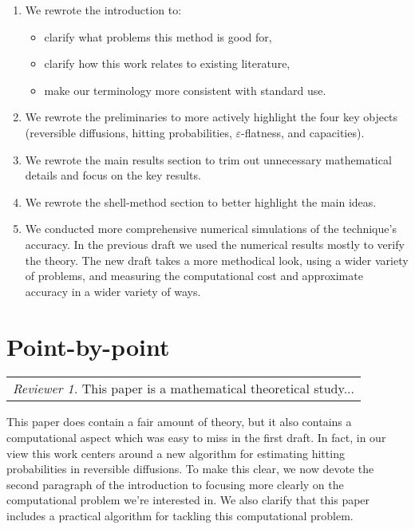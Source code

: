 \documentclass{article}
\begin{document}
\begin{enumerate}
    \item We rewrote the introduction to:
    \begin{itemize}
        \item clarify what problems this method is good for,
        \item clarify how this work relates to existing literature,
        \item make our terminology more consistent with standard use.
    \end{itemize}
    \item We rewrote the preliminaries to more actively highlight the four key objects (reversible diffusions, hitting probabilities, $\varepsilon$-flatness, and capacities).
    \item We rewrote the main results section to trim out unnecessary mathematical details and focus on the key results.
    \item We rewrote the shell-method section to better highlight the main ideas.
    \item We conducted more comprehensive numerical simulations of the technique's accuracy.  In the previous draft we used the numerical results mostly to verify the theory.  The new draft takes
a more methodical look, using a wider variety of problems, and measuring the computational cost and approximate accuracy in a wider variety of ways.
\end{enumerate}


\section{Point-by-point}

\newcommand{\rev}[3]{\noindent\begin{tabular}{|p{4.5in}}\emph{Reviewer #1.}  #2\end{tabular}\vspace{.1in}

#3\vspace{.3in}}

\rev{1}{This paper is a mathematical theoretical study...}{

This paper does contain a fair amount of theory, but it also contains a computational aspect which was easy to miss in the first draft.  In fact, in our view this work centers around a new algorithm for estimating hitting probabilities in reversible diffusions.  To make this clear, we now devote the second paragraph of the introduction to focusing more clearly on the computational problem we're interested in.  We also clarify that this paper includes a practical algorithm for tackling this computational problem.}
\end{document}
